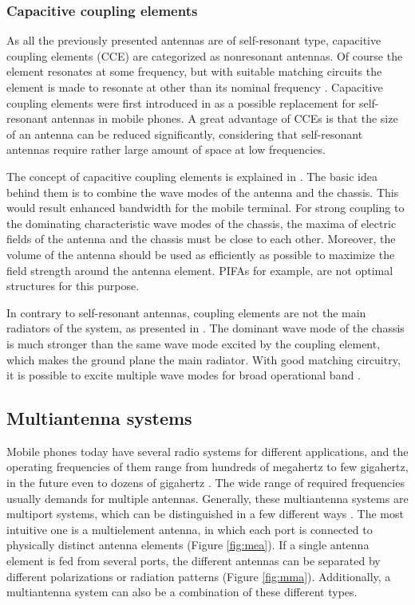 \subsubsection{Capacitive coupling elements}
\label{sec:cce}
As all the previously presented antennas are of self-resonant type, capacitive coupling elements (CCE) are categorized as nonresonant antennas. Of course the element resonates at some frequency, but with suitable matching circuits the element is made to resonate at other than its nominal frequency \cite{valkonen_cce}. Capacitive coupling elements were first introduced in \cite{vainikainen_resonator_analysis} as a possible replacement for self-resonant antennas in mobile phones. A great advantage of CCEs is that the size of an antenna can be reduced significantly, considering that self-resonant antennas require rather large amount of space at low frequencies. 

The concept of capacitive coupling elements is explained in \cite{vainikainen_resonator_analysis, villanen_cce}. The basic idea behind them is to combine the wave modes of the antenna and the chassis. This would result enhanced bandwidth for the mobile terminal. For strong coupling to the dominating characteristic wave modes of the chassis, the maxima of electric fields of the antenna and the chassis must be close to each other. Moreover, the volume of the antenna should be used as efficiently as possible to maximize the field strength around the antenna element. PIFAs for example, are not optimal structures for this purpose. 

In contrary to self-resonant antennas, coupling elements are not the main radiators of the system, as presented in \cite{villanen_cce}. The dominant wave mode of the chassis is much stronger than the same wave mode excited by the coupling element, which makes the ground plane the main radiator. With good matching circuitry, it is possible to excite multiple wave modes for broad operational band \cite{valkonen_cce}.


\subsection{Multiantenna systems}
\label{sec:multiant}
Mobile phones today have several radio systems for different applications, and the operating frequencies of them range from hundreds of megahertz to few gigahertz, in the future even to dozens of gigahertz \cite{20ant}. The wide range of required frequencies usually demands for multiple antennas. Generally, these multiantenna systems are multiport systems, which can be distinguished in a few different ways \cite{multiantenna_mimo_book}. The most intuitive one is a multielement antenna, in which each port is connected to physically distinct antenna elements (Figure \ref{fig:mea}). If a single antenna element is fed from several ports, the different antennas can be separated by different polarizations or radiation patterns (Figure \ref{fig:mma}). Additionally, a multiantenna system can also be a combination of these different types.

